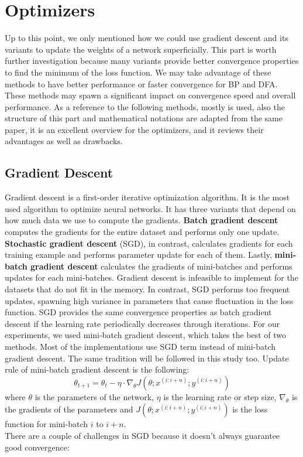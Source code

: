 \documentclass[a4paper, nobind]{templates/ociamthesis}
\begin{document}
\hypertarget{optimizers}{%
\section{Optimizers}\label{optimizers}}

Up to this point, we only mentioned how we could use gradient descent and its variants to update the weights of a network superficially. This part is worth further investigation because many variants provide better convergence properties to find the minimum of the loss function. We may take advantage of these methods to have better performance or faster convergence for BP and DFA. These methods may spawn a significant impact on convergence speed and overall performance. As a reference to the following methods, mostly \cite{DBLP:journals/corr/Ruder16} is used, also the structure of this part and mathematical notations are adapted from the same paper, it is an excellent overview for the optimizers, and it reviews their advantages as well as drawbacks.

\hypertarget{gradient-descent}{%
\subsection{Gradient Descent}\label{gradient-descent}}

Gradient descent is a first-order iterative optimization algorithm. It is the most used algorithm to optimize neural networks. It has three variants that depend on how much data we use to compute the gradients. \textbf{Batch gradient descent} computes the gradients for the entire dataset and performs only one update. \textbf{Stochastic gradient descent} (SGD), in contrast, calculates gradients for each training example and performs parameter update for each of them. Lastly, \textbf{mini-batch gradient descent} calculates the gradients of mini-batches and performs updates for each mini-batches.
Gradient descent is infeasible to implement for the datasets that do not fit in the memory. In contrast, SGD performs too frequent updates, spawning high variance in parameters that cause fluctuation in the loss function. SGD provides the same convergence properties as batch gradient descent if the learning rate periodically decreases through iterations. For our experiments, we used mini-batch gradient descent, which takes the best of two methods. Most of the implementations use SGD term instead of mini-batch gradient descent. The same tradition will be followed in this study too. Update rule of mini-batch gradient descent is the following:
\[
\theta_{t+1}=\theta_t-\eta \cdot \nabla_{\theta} J\left(\theta ; x^{(i: i+n)} ; y^{(i: i+n)}\right)
\]
where \(\theta\) is the parameters of the network, \(\eta\) is the learning rate or step size, \(\nabla_{\theta}\) is the gradients of the parameters and \(J\left(\theta ; x^{(i: i+n)} ; y^{(i: i+n)}\right)\) is the loss function for mini-batch \(i\) to \(i+n\).\\
There are a couple of challenges in SGD because it doesn't always guarantee good convergence:
\end{document}
